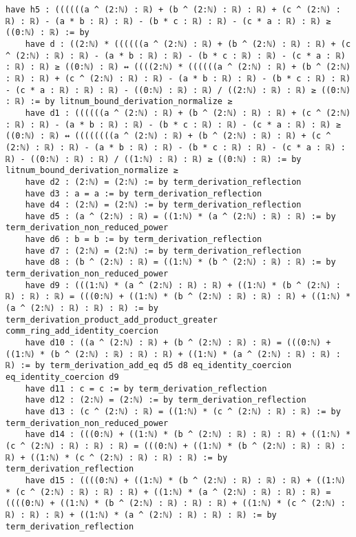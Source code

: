 \documentclass{article}
\begin{document}
\begin{tcolorbox}[colback=white!10, width=\linewidth]
\begin{lstlisting}[language=Lean4]
  have h5 : ((((((a ^ (2:ℕ) : ℝ) + (b ^ (2:ℕ) : ℝ) : ℝ) + (c ^ (2:ℕ) : ℝ) : ℝ) - (a * b : ℝ) : ℝ) - (b * c : ℝ) : ℝ) - (c * a : ℝ) : ℝ) ≥ ((0:ℕ) : ℝ) := by
    have d : ((2:ℕ) * ((((((a ^ (2:ℕ) : ℝ) + (b ^ (2:ℕ) : ℝ) : ℝ) + (c ^ (2:ℕ) : ℝ) : ℝ) - (a * b : ℝ) : ℝ) - (b * c : ℝ) : ℝ) - (c * a : ℝ) : ℝ) : ℝ) ≥ ((0:ℕ) : ℝ) ↔ ((((2:ℕ) * ((((((a ^ (2:ℕ) : ℝ) + (b ^ (2:ℕ) : ℝ) : ℝ) + (c ^ (2:ℕ) : ℝ) : ℝ) - (a * b : ℝ) : ℝ) - (b * c : ℝ) : ℝ) - (c * a : ℝ) : ℝ) : ℝ) - ((0:ℕ) : ℝ) : ℝ) / ((2:ℕ) : ℝ) : ℝ) ≥ ((0:ℕ) : ℝ) := by litnum_bound_derivation_normalize ≥
    have d1 : ((((((a ^ (2:ℕ) : ℝ) + (b ^ (2:ℕ) : ℝ) : ℝ) + (c ^ (2:ℕ) : ℝ) : ℝ) - (a * b : ℝ) : ℝ) - (b * c : ℝ) : ℝ) - (c * a : ℝ) : ℝ) ≥ ((0:ℕ) : ℝ) ↔ ((((((((a ^ (2:ℕ) : ℝ) + (b ^ (2:ℕ) : ℝ) : ℝ) + (c ^ (2:ℕ) : ℝ) : ℝ) - (a * b : ℝ) : ℝ) - (b * c : ℝ) : ℝ) - (c * a : ℝ) : ℝ) - ((0:ℕ) : ℝ) : ℝ) / ((1:ℕ) : ℝ) : ℝ) ≥ ((0:ℕ) : ℝ) := by litnum_bound_derivation_normalize ≥
    have d2 : (2:ℕ) = (2:ℕ) := by term_derivation_reflection
    have d3 : a = a := by term_derivation_reflection
    have d4 : (2:ℕ) = (2:ℕ) := by term_derivation_reflection
    have d5 : (a ^ (2:ℕ) : ℝ) = ((1:ℕ) * (a ^ (2:ℕ) : ℝ) : ℝ) := by term_derivation_non_reduced_power
    have d6 : b = b := by term_derivation_reflection
    have d7 : (2:ℕ) = (2:ℕ) := by term_derivation_reflection
    have d8 : (b ^ (2:ℕ) : ℝ) = ((1:ℕ) * (b ^ (2:ℕ) : ℝ) : ℝ) := by term_derivation_non_reduced_power
    have d9 : (((1:ℕ) * (a ^ (2:ℕ) : ℝ) : ℝ) + ((1:ℕ) * (b ^ (2:ℕ) : ℝ) : ℝ) : ℝ) = (((0:ℕ) + ((1:ℕ) * (b ^ (2:ℕ) : ℝ) : ℝ) : ℝ) + ((1:ℕ) * (a ^ (2:ℕ) : ℝ) : ℝ) : ℝ) := by term_derivation_product_add_product_greater comm_ring_add_identity_coercion
    have d10 : ((a ^ (2:ℕ) : ℝ) + (b ^ (2:ℕ) : ℝ) : ℝ) = (((0:ℕ) + ((1:ℕ) * (b ^ (2:ℕ) : ℝ) : ℝ) : ℝ) + ((1:ℕ) * (a ^ (2:ℕ) : ℝ) : ℝ) : ℝ) := by term_derivation_add_eq d5 d8 eq_identity_coercion eq_identity_coercion d9
    have d11 : c = c := by term_derivation_reflection
    have d12 : (2:ℕ) = (2:ℕ) := by term_derivation_reflection
    have d13 : (c ^ (2:ℕ) : ℝ) = ((1:ℕ) * (c ^ (2:ℕ) : ℝ) : ℝ) := by term_derivation_non_reduced_power
    have d14 : (((0:ℕ) + ((1:ℕ) * (b ^ (2:ℕ) : ℝ) : ℝ) : ℝ) + ((1:ℕ) * (c ^ (2:ℕ) : ℝ) : ℝ) : ℝ) = (((0:ℕ) + ((1:ℕ) * (b ^ (2:ℕ) : ℝ) : ℝ) : ℝ) + ((1:ℕ) * (c ^ (2:ℕ) : ℝ) : ℝ) : ℝ) := by term_derivation_reflection
    have d15 : ((((0:ℕ) + ((1:ℕ) * (b ^ (2:ℕ) : ℝ) : ℝ) : ℝ) + ((1:ℕ) * (c ^ (2:ℕ) : ℝ) : ℝ) : ℝ) + ((1:ℕ) * (a ^ (2:ℕ) : ℝ) : ℝ) : ℝ) = ((((0:ℕ) + ((1:ℕ) * (b ^ (2:ℕ) : ℝ) : ℝ) : ℝ) + ((1:ℕ) * (c ^ (2:ℕ) : ℝ) : ℝ) : ℝ) + ((1:ℕ) * (a ^ (2:ℕ) : ℝ) : ℝ) : ℝ) := by term_derivation_reflection

\end{lstlisting}
\end{tcolorbox}
\end{document}
